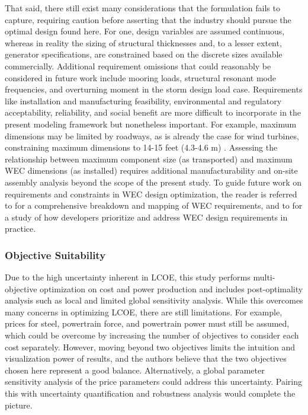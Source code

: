 That said, there still exist many considerations that the formulation fails to capture, requiring caution before asserting that the industry should pursue the optimal design found here.
For one, design variables are assumed continuous, whereas in reality the sizing of structural thicknesses and, to a lesser extent, generator specifications, are constrained based on the discrete sizes available commercially.
Additional requirement omissions that could reasonably be considered in future work include mooring loads, structural resonant mode frequencies, and overturning moment in the storm design load case.
Requirements like installation and manufacturing feasibility, environmental and regulatory acceptability, reliability, and social benefit are more difficult to incorporate in the present modeling framework but nonetheless important.
For example, maximum dimensions may be limited by roadways, as is already the case for wind turbines, constraining maximum dimensions to 14-15 feet (4.3-4.6 m) \cite{cotrell_analysis_2014}.
Assessing the relationship between maximum component size (as transported) and maximum WEC dimensions (as installed) requires additional manufacturability and on-site assembly analysis beyond the scope of the present study.
To guide future work on requirements and constraints in WEC design optimization, the reader is referred to \cite{bull_systems_2017,babarit_stakeholder_2017} for a comprehensive breakdown and mapping of WEC requirements, and to \cite{trueworthy_wave_2020} for a study of how developers prioritize and address WEC design requirements in practice.

\subsubsection{Objective Suitability}
Due to the high uncertainty inherent in LCOE, this study performs multi-objective optimization on cost and power production and includes post-optimality analysis such as local and limited global sensitivity analysis.
While this overcomes many concerns in optimizing LCOE, there are still limitations.
For example, prices for steel, powertrain force, and powertrain power must still be assumed, which could be overcome by increasing the number of objectives to consider each cost separately.
However, moving beyond two objectives limits the intuition and visualization power of results, and the authors believe that the two objectives chosen here represent a good balance.
Alternatively, a global parameter sensitivity analysis of the price parameters could address this uncertainty. Pairing this with uncertainty quantification and robustness analysis would complete the picture.

